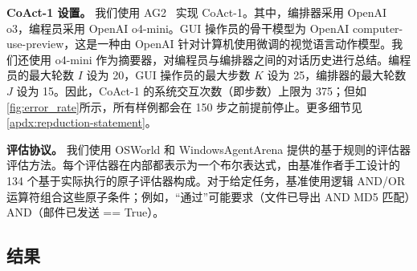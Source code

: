 \documentclass{article} %
\newcommand{\ours}{CoAct-1\xspace}
\begin{document}
\noindent\textbf{\ours 设置。} 我们使用 AG2~\citep{wu2023autogenenablingnextgenllm} 实现 \ours。其中，编排器采用 OpenAI o3，编程员采用 OpenAI o4-mini。GUI 操作员的骨干模型为 OpenAI computer-use-preview，这是一种由 OpenAI 针对计算机使用微调的视觉语言动作模型。我们还使用 o4-mini 作为摘要器，对编程员与编排器之间的对话历史进行总结。编程员的最大轮数 $I$ 设为 20，GUI 操作员的最大步数 $K$ 设为 25，编排器的最大轮数 $J$ 设为 15。因此，\ours 的系统交互次数（即步数）上限为 375；但如\autoref{fig:error_rate}所示，所有样例都会在 150 步之前提前停止。更多细节见\autoref{apdx:repduction-statement}。

\noindent\textbf{评估协议。}
我们使用 OSWorld 和 WindowsAgentArena 提供的基于规则的评估器评估方法。每个评估器在内部都表示为一个布尔表达式，由基准作者手工设计的 134 个基于实际执行的原子评估器构成。对于给定任务，基准使用逻辑 AND/OR 运算符组合这些原子条件；例如，“通过”可能要求（文件已导出 AND MD5 匹配）AND（邮件已发送 == True）。


\subsection{结果}
\end{document}
